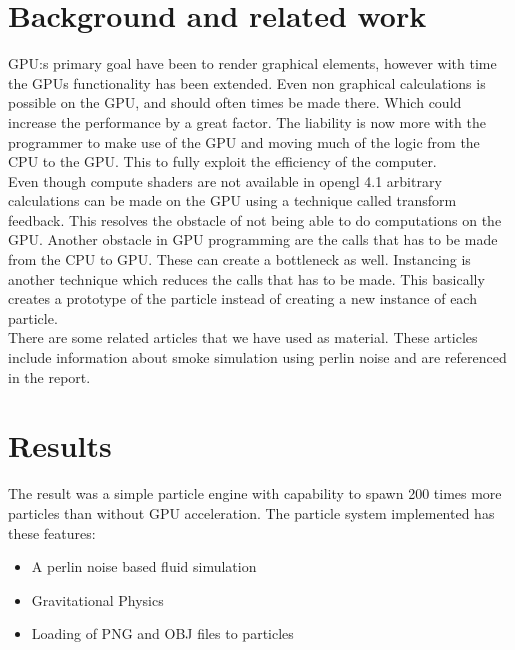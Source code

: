 \documentclass[report]{vgtc}
\begin{document}
\section{Background and related work}
GPU:s primary goal have been to render graphical elements, however with time the GPUs functionality has been extended. Even non graphical calculations is possible on the GPU, and should often times be made there. Which could increase the performance by a great factor. The liability is now more with the programmer to make use of the GPU and moving much of the logic from the CPU to the GPU. This to fully exploit the efficiency of the computer.
\\
Even though compute shaders are not available in opengl 4.1 arbitrary calculations can be made on the GPU using a technique called transform feedback. This resolves the obstacle of not being able to do computations on the GPU. Another obstacle in GPU programming are the calls that has to be made from the CPU to GPU. These can create a bottleneck as well. Instancing is another technique which reduces the calls that has to be made. This basically creates a prototype of the particle instead of creating a new instance of each particle.
\\
There are some related articles that we have used as material. These articles include information about smoke simulation using perlin noise and are referenced in the report.
\section{Results}

The result was a simple particle engine with capability to spawn 200 times more particles than without GPU acceleration. The particle system implemented has these features:

\begin{itemize}
  \item A perlin noise based fluid simulation
  \item Gravitational Physics
  \item Loading of PNG and OBJ files to particles
\end{itemize}
\end{document}
